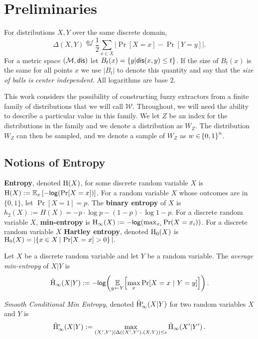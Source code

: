 
\section{Preliminaries}
\label{sec:prelim}
For distributions $X, Y$ over the same discrete domain,
\[
\Delta(X, Y)\overset{def}= \frac{1}{2}\sum_{x \in X} \left| \Pr[X=x] - \Pr[Y=y]\right|.
\]
For a metric space $(\mathcal{M}, \mathsf{dis})$ let $B_t(x) = \{y | \mathsf{dis}(x, y)\le t\}$. If the size of $B_t(x)$ is the same for all points $x$ we use $|B_t|$ to denote this quantity and say that the \emph{size of balls is center independent}.  All logarithms are base $2$.

This work considers the possibility of constructing fuzzy extractors from a finite family of distributions that we will call $\mathcal{W}$. 
Throughout, we will need the ability to describe a particular value in this family.  
We let $Z$ be an index for the distributions in the family and we denote a distribution as $W_Z$. 
The distribution $W_Z$ can then be sampled, and we denote a sample of $W_Z$ as $w \in \!\left\{ 0,1 \right\}^{n}$. 

\subsection{Notions of Entropy}
    \textbf{Entropy}, denoted $\mathrm{H}\!\left(X\right)$, for some discrete random variable $X$ is $\mathrm{H}\!\left(X\right) := \operatorname*{\mathbb{E}}_x\left[-\mathsf{log}\!\left(\Pr[X=x]\right)\right]$. 
    For a random variable $X$ whose outcomes are in $\{0,1\}$, let $\Pr[X=1] = p$. The \textbf{binary entropy} of $X$ is  $h_2(X) :=H(X)=-p\cdot\log{p} - (1-p)\cdot\log{1-p}.$ 
For a discrete random variable $X$, 
    \textbf{min-entropy} is $\mathrm{H}_{\infty}\!\left(X\right) := -\mathsf{log}\!\left(\max_{x_i} \Pr(X=x_i)\right)$.  
For a discrete random variable $X$ \textbf{Hartley entropy}, denoted $\mathrm{H}_0\!\left(X\right)$ is 
$  \mathrm{H}_0\!\left(X\right) = | \!\left\{ x \in X\,|\, \Pr\!\left[X = x\right] > 0 \right\}|.
  $
\begin{definition}
Let $X$ be a discrete random variable and let $Y$ be a random variable.  The \emph{average min-entropy} of $X|Y$ is  \[ \tilde{\mathrm{H}}_{\infty}\!\left(X|Y\right) := -\mathsf{log}\!\left(\operatorname*{\mathbb{E}}\limits_{y \leftarrow Y}\!\left[\max\limits_{x} \Pr\!\left[X = x\ |\ Y = y\right]\right]\right).\] 
\end{definition}

\begin{definition}
    \emph{Smooth Conditional Min Entropy}, denoted $\tilde{\mathrm{H}}_\infty^\epsilon(X|Y)$ for two random variables $X$ and $Y$ is \[\tilde{\mathrm{H}}_\infty^\epsilon(X|Y):=\max_{(X',Y') | \Delta((X', Y'), (X, Y))\le \epsilon} \tilde{\mathrm{H}}_{\infty}\!\left(X'|Y'\right).
    \] 
\end{definition}

